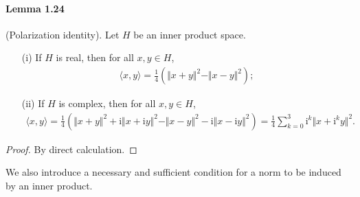 \documentclass{article}
\renewcommand{\i}{\mathrm{i}}
\begin{document}
\paragraph{Lemma 1.24\label{lemma:1.24}} (Polarization identity). Let $H$ be an inner product space.
\begin{itemize}
	\item[(i)] If $H$ is real, then for all $x,y\in H$,
	\begin{align*}
		\langle x,y\rangle = \frac{1}{4}\left(\Vert x+y\Vert^2 - \Vert x-y\Vert^2\right);\tag{1.8}\label{eq:1.8}
	\end{align*}
	\item[(ii)] If $H$ is complex, then for all $x,y\in H$,
	\begin{align*}
		\langle x,y\rangle = \frac{1}{4}\left(\Vert x+y\Vert^2 + \i\Vert x+\i y\Vert^2 - \Vert x-y\Vert^2 - \i\Vert x-\i y\Vert^2\right) = \frac{1}{4}\sum_{k=0}^3\i^k\Vert x+\i^k y\Vert^2.\tag{1.9}\label{eq:1.9}
	\end{align*}
\end{itemize}
\begin{proof}
	By direct calculation.
\end{proof}

We also introduce a necessary and sufficient condition for a norm to be induced by an inner product.
\end{document}
